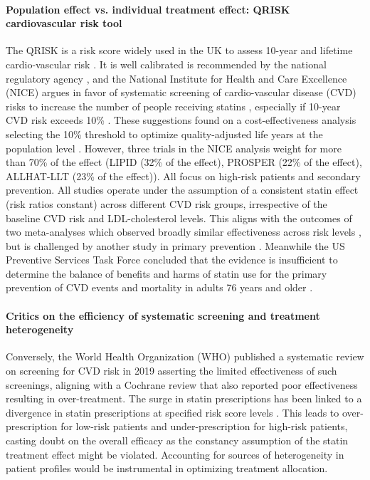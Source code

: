 \documentclass[10pt,letterpaper]{article}
\begin{document}
\paragraph{Population effect vs. individual treatment effect: QRISK cardiovascular risk tool }
The QRISK is a risk score widely used in the UK to assess 10-year and lifetime cardio-vascular risk \cite{hippisley2017development}. It is well calibrated is recommended by the national regulatory agency \cite{guideline2023cardiovascular}, and the National Institute for Health and Care Excellence (NICE) argues in favor of systematic screening of cardio-vascular disease (CVD) risks to increase the number of people receiving statins \cite{guideline2023cardiovascular}, especially if 10-year CVD risk exceeds 10\% \cite{rabar2014lipid}.
These suggestions found on a cost-effectiveness analysis selecting the 10\% threshold to optimize quality-adjusted life years at the population level \cite{guthrie2023competing}. However, three trials in the NICE analysis weight for more than 70\% of the effect (LIPID \cite{long1998prevention} (32\% of the effect), PROSPER \cite{shepherd2002pravastatin} (22\% of the effect), ALLHAT-LLT \cite{antihypertensive2002major} (23\% of the effect)). All focus on high-risk patients and secondary prevention. All studies operate under the assumption of a consistent statin effect (risk ratios constant) across different CVD risk groups, irrespective of the baseline CVD risk and LDL-cholesterol levels. This aligns with the outcomes of two meta-analyses which observed broadly similar effectiveness across risk levels \cite{brugts2009benefits}, but is challenged by another study in primary prevention \cite{byrne2019statins}. Meanwhile the US Preventive Services Task Force concluded that the evidence is insufficient to determine the balance of benefits and harms of statin use for the primary prevention of CVD events and mortality in adults 76 years and older \cite{chou2022statin}.

\paragraph{Critics on the efficiency of systematic screening and treatment heterogeneity}
Conversely, the World Health Organization (WHO) published a systematic review on screening for CVD risk in 2019 \cite{eriksen2021effectiveness} asserting the limited effectiveness of such screenings, aligning with a Cochrane review that also reported poor effectiveness \cite{krogsboll2012general} resulting in over-treatment. The surge in statin prescriptions has been linked to a divergence in statin prescriptions at specified risk score levels \cite{van2013efficiency}. This leads to over-prescription for low-risk patients and under-prescription for high-risk patients, casting doubt on the overall efficacy as the constancy assumption of the statin treatment effect might be violated. Accounting for sources of heterogeneity in patient profiles would be instrumental in optimizing treatment allocation. 
\end{document}
